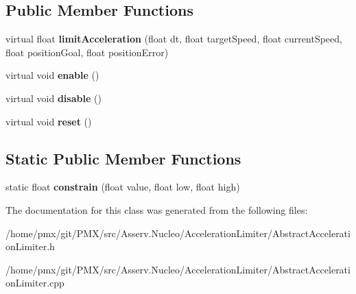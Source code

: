 \subsection*{Public Member Functions}
\begin{DoxyCompactItemize}
\item 
\mbox{\label{classAbstractAccelerationLimiter_a229b985a2ed69ef70e166ed737b1aeb9}} 
virtual float {\bfseries limit\+Acceleration} (float dt, float target\+Speed, float current\+Speed, float position\+Goal, float position\+Error)
\item 
\mbox{\label{classAbstractAccelerationLimiter_a6e54de6947fd13351126d5a0321405ee}} 
virtual void {\bfseries enable} ()
\item 
\mbox{\label{classAbstractAccelerationLimiter_a93f727ad1d8a0b307f6b813ccbc164a4}} 
virtual void {\bfseries disable} ()
\item 
\mbox{\label{classAbstractAccelerationLimiter_a942357de40aa435b084780310b57043b}} 
virtual void {\bfseries reset} ()
\end{DoxyCompactItemize}
\subsection*{Static Public Member Functions}
\begin{DoxyCompactItemize}
\item 
\mbox{\label{classAbstractAccelerationLimiter_a06ec4af35b8bd67d7d267b555aa28996}} 
static float {\bfseries constrain} (float value, float low, float high)
\end{DoxyCompactItemize}


The documentation for this class was generated from the following files\+:\begin{DoxyCompactItemize}
\item 
/home/pmx/git/\+P\+M\+X/src/\+Asserv.\+Nucleo/\+Acceleration\+Limiter/Abstract\+Acceleration\+Limiter.\+h\item 
/home/pmx/git/\+P\+M\+X/src/\+Asserv.\+Nucleo/\+Acceleration\+Limiter/Abstract\+Acceleration\+Limiter.\+cpp\end{DoxyCompactItemize}

